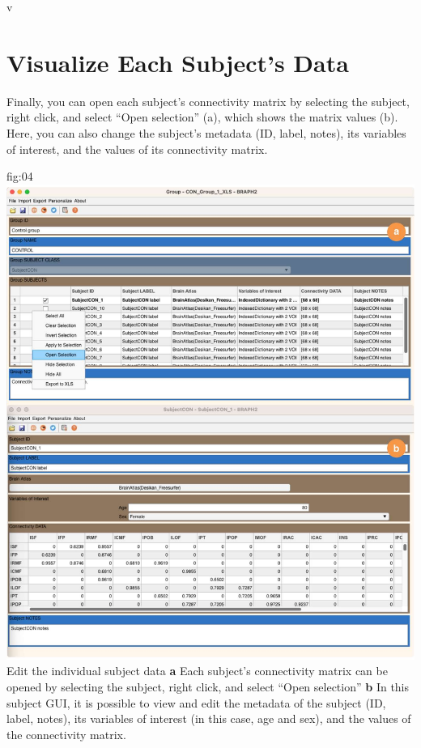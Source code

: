 v\documentclass[justified]{tufte-handout}
\begin{document}

\section{Visualize Each Subject's Data}

Finally, you can open each subject's connectivity matrix by selecting the subject, right click, and select ``Open selection'' (a), which shows the matrix values (b). Here, you can also change the subject's metadata (ID, label, notes), its variables of interest, and the values of its connectivity matrix.

	{fig:04}
	{\includegraphics{fig04.jpg}
	}
	{Edit the individual subject data}
	{
	{\bf a}  Each subject's connectivity matrix can be opened by selecting the subject, right click, and select ``Open selection''
	{\bf b} In this subject GUI, it is possible to view and edit the metadata of the subject (ID, label, notes), its variables of interest (in this case, age and sex), and the values of the connectivity matrix. 
	}

\end{document}
